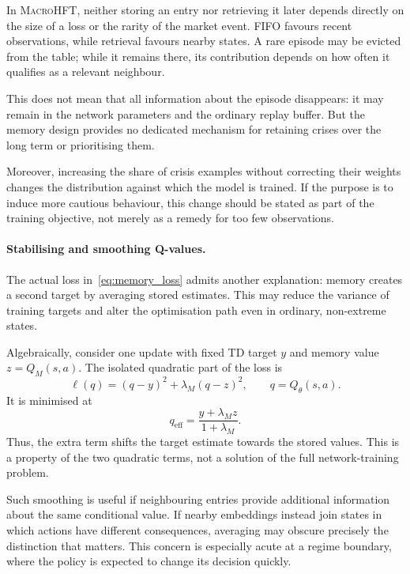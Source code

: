 \documentclass[9pt,a4paper,twocolumn]{extarticle}
\newcommand{\Macro}{\textsc{MacroHFT}}
\begin{document}
In \Macro{}, neither storing an entry nor retrieving it later depends directly on the size of a
loss or the rarity of the market event. FIFO favours recent observations, while retrieval favours
nearby states. A rare episode may be evicted from the table; while it remains there, its
contribution depends on how often it qualifies as a relevant neighbour.

This does not mean that all information about the episode disappears: it may remain in the
network parameters and the ordinary replay buffer. But the memory design provides no dedicated
mechanism for retaining crises over the long term or prioritising them.

Moreover, increasing the share of crisis examples without correcting their weights changes the
distribution against which the model is trained. If the purpose is to induce more cautious
behaviour, this change should be stated as part of the training objective, not merely as a remedy
for too few observations.

\paragraph{Stabilising and smoothing Q-values.}

The actual loss in~\eqref{eq:memory_loss} admits another explanation: memory creates a second
target by averaging stored estimates. This may reduce the variance of training targets and alter
the optimisation path even in ordinary, non-extreme states.

Algebraically, consider one update with fixed TD target $y$ and memory value $z=Q_M(s,a)$. The
isolated quadratic part of the loss is
\begin{equation}
  \ell(q)
  =
  (q-y)^2+\lambda_M(q-z)^2,
  \qquad q=Q_\theta(s,a).
  \label{eq:two_targets_loss}
\end{equation}
It is minimised at
\begin{equation}
  q_{\mathrm{eff}}
  =
  \frac{y+\lambda_M z}{1+\lambda_M}.
  \label{eq:effective_memory_target}
\end{equation}
Thus, the extra term shifts the target estimate towards the stored values. This is a property of
the two quadratic terms, not a solution of the full network-training problem.

Such smoothing is useful if neighbouring entries provide additional information about the same
conditional value. If nearby embeddings instead join states in which actions have different
consequences, averaging may obscure precisely the distinction that matters. This concern is
especially acute at a regime boundary, where the policy is expected to change its decision
quickly.
\end{document}
